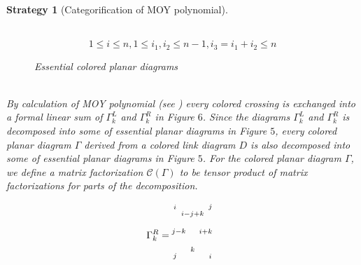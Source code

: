 \documentclass[10pt]{amsart}
\theoremstyle{break}
\newtheorem{str}[de]{Strategy}
\begin{document}
\begin{str}[Categorification of MOY polynomial]
\begin{itemize}
\begin{figure}[htb]
\\
\begin{equation*}
1\leq i\leq n, 1\leq i_1,i_2\leq n-1, i_3=i_1+i_2\leq n
\end{equation*}
\caption{Essential colored planar diagrams}
\end{figure}
\\
\indent By calculation of MOY polynomial (see \cite{MOY}) every colored crossing is exchanged into a formal linear sum of $\Gamma^L_k$ and $\Gamma^R_k$ in Figure $6$. Since the diagrams $\Gamma^L_k$ and $\Gamma^R_k$ is decomposed into some of essential planar diagrams in Figure $5$, every colored planar diagram $\Gamma$ derived from a colored link diagram $D$ is also decomposed into some of essential planar diagrams in Figure $5$. For the colored planar diagram $\Gamma$, we define a matrix factorization ${{\mathcal{C}}}\acute{}(\Gamma)$ to be tensor product of matrix factorizations for parts of the decomposition.
\begin{figure}[hbt]\begin{eqnarray*}
\Gamma^R_k=
\unitlength 0.1in
\begin{picture}(  6.5000,  5.00)(  2.0000,-7.300)
\special{pn 8}\special{pa 800 236}\special{pa 800 1036}\special{fp}\special{sh 1}\special{pa 800 236}\special{pa 780 304}\special{pa 800 290}\special{pa 820 304}\special{pa 800 236}\special{fp}\special{sh 1}\special{pa 800 436}\special{pa 780 504}\special{pa 800 490}\special{pa 820 504}\special{pa 800 436}\special{fp}\special{sh 1}\special{pa 800 836}\special{pa 780 904}\special{pa 800 890}\special{pa 820 904}\special{pa 800 836}\special{fp}\special{pn 8}\special{pa 200 436}\special{pa 800 436}\special{fp}\special{sh 1}\special{pa 200 436}\special{pa 267 416}\special{pa 252 436}\special{pa 267 456}\special{pa 200 436}\special{fp}\special{pn 8}\special{pa 200 836}\special{pa 800 836}\special{fp}\special{sh 1}\special{pa 800 836}\special{pa 733 816}\special{pa 746 836}\special{pa 733 856}\special{pa 800 836}\special{fp}\special{pn 8}\special{pa 200 236}\special{pa 200 1036}\special{fp}\special{sh 1}\special{pa 200 236}\special{pa 180 304}\special{pa 200 290}\special{pa 218 304}\special{pa 200 236}\special{fp}\special{sh 1}\special{pa 200 436}\special{pa 180 504}\special{pa 200 490}\special{pa 218 504}\special{pa 200 436}\special{fp}\special{sh 1}\special{pa 200 836}\special{pa 180 904}\special{pa 200 890}\special{pa 218 904}\special{pa 200 836}\special{fp}\put(7.4500,-2.8500){\special{rt 0 0  3.1416}\makebox(0,0){${}_{j}$}}\special{rt 0 0 0}\put(2.4500,-2.8500){\special{rt 0 0  3.1416}\makebox(0,0){${}_{i}$}}\special{rt 0 0 0}\put(2.4500,-9.8500){\special{rt 0 0  3.1416}\makebox(0,0){${}_{j}$}}\special{rt 0 0 0}\put(7.4500,-9.8500){\special{rt 0 0  3.1416}\makebox(0,0){${}_{i}$}}\special{rt 0 0 0}\put(4.9500,-3.8500){\special{rt 0 0  3.1416}\makebox(0,0){${}_{i-j+k}$}}\special{rt 0 0 0}\put(6.800,-6.3500){\special{rt 0 0  3.1416}\makebox(0,0){${}_{i+k}$}}\special{rt 0 0 0}\put(4.9500,-8.8500){\special{rt 0 0  3.1416}\makebox(0,0){${}_{k}$}}\special{rt 0 0 0}\put(3.00,-6.3500){\special{rt 0 0  3.1416}\makebox(0,0){${}_{j-k}$}}\special{rt 0 0 0}\end{picture}

\end{eqnarray*}
\end{figure}
\end{itemize}
\end{str}
\end{document}
